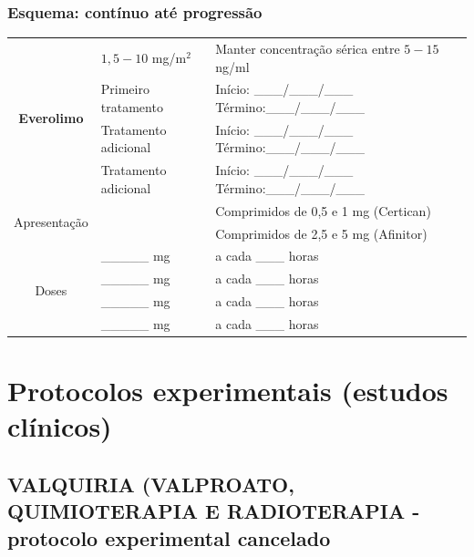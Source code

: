 \documentclass[11pt,a4paper,oldfontcommands]{memoir}
\begin{document}
\subsection{Esquema: contínuo até progressão}
\begin{center}
\begin{table}[H]
	\begin{tabular}{p{2.0cm}|p{5cm}|p{7cm}}
    \hline
		\multicolumn{1}{c|}{\multirow{4}{*}{\textbf{Everolimo}}}&{\(1,5 - 10\) mg/m\(^2\)}&{Manter concentração sérica entre \(5-15\) ng/ml}\\
		\multicolumn{1}{c|}{}&{Primeiro tratamento}&{Início: \_\_\_/\_\_\_/\_\_\_ Término:\_\_\_/\_\_\_/\_\_\_}\\
		\multicolumn{1}{c|}{}&{Tratamento adicional}&{Início: \_\_\_/\_\_\_/\_\_\_ Término:\_\_\_/\_\_\_/\_\_\_}\\
		\multicolumn{1}{c|}{}&{Tratamento adicional}&{Início: \_\_\_/\_\_\_/\_\_\_ Término:\_\_\_/\_\_\_/\_\_\_}\\
    \hline
		\multicolumn{1}{c|}{\multirow{2}{*}{Apresentação}}&{}&{Comprimidos de 0,5 e 1 mg (Certican)}\\
		\multicolumn{1}{|c}{}&{}&{Comprimidos de 2,5 e 5 mg (Afinitor)}\\
    \hline
		\multicolumn{1}{|c}{\multirow{4}{*}{Doses}}&{\_\_\_\_\_ mg}&{a cada \_\_\_ horas}\\
		\multicolumn{1}{|c}{}&{\_\_\_\_\_ mg}&{a cada \_\_\_ horas}\\
		\multicolumn{1}{|c}{}&{\_\_\_\_\_ mg}&{a cada \_\_\_ horas}\\
		\multicolumn{1}{|c}{}&{\_\_\_\_\_ mg}&{a cada \_\_\_ horas}\\
    \hline
\end{tabular}
\end{table}
\end{center}

\cleardoublepage
\chapter{Protocolos experimentais (estudos clínicos)}
\cleardoublepage

\section{VALQUIRIA (VALPROATO, QUIMIOTERAPIA E RADIOTERAPIA - protocolo experimental cancelado}
{\let\thefootnote\relax{}}
\end{document}
